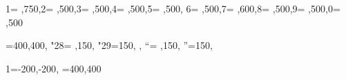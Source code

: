 \usepackage{uarial}
\usepackage[expert]{mathdesign}
\renewcommand{\familydefault}{\sfdefault}


\usepackage[activate={true,nocompatibility},final,tracking=true,kerning=true,spacing=true,factor=1100,stretch=10,shrink=10]{microtype}

              {1={ ,750},2={ ,500},3={ ,500},4={ ,500},5={ ,500},
               6={ ,500},7={ ,600},8={ ,500},9={ ,500},0={ ,500}}

{\textendash={400,400}, %
	"28={ ,150}, %
	"29={150, }, %
	\textquotedblleft={ ,150}, %
	\textquotedblright={150, }} %

{1={-200,-200}, 
	\textendash={400,400}}

\frenchspacing



\usepackage[backend=biber
		  , style=apa
		  , hyperref=true
		  , url=false
		  , isbn=false
		  , backref=true
		  , citereset=chapter
		  , maxcitenames=3
		  , maxbibnames=100
		  , block=none
		  , sortcites=true
		  , sorting=nyt
		  , apabackref=true
		  , language=spanish
]{biblatex}


